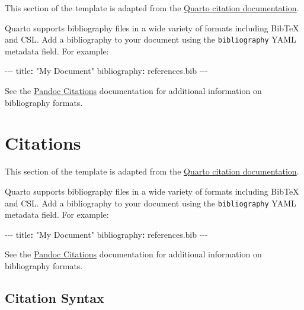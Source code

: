 \documentclass[
]{interact}
\newenvironment{Shaded}{\begin{snugshade}}{\end{snugshade}}
\newcommand{\AttributeTok}[1]{\textcolor[rgb]{0.40,0.45,0.13}{#1}}
\newcommand{\FunctionTok}[1]{\textcolor[rgb]{0.28,0.35,0.67}{#1}}
\newcommand{\KeywordTok}[1]{\textcolor[rgb]{0.00,0.23,0.31}{\textbf{#1}}}
\newcommand{\PreprocessorTok}[1]{\textcolor[rgb]{0.68,0.00,0.00}{#1}}
\newcommand{\StringTok}[1]{\textcolor[rgb]{0.13,0.47,0.30}{#1}}
\begin{document}
This section of the template is adapted from the
\href{https://quarto.org/docs/authoring/footnotes-and-citations.html}{Quarto
citation documentation}.

Quarto supports bibliography files in a wide variety of formats
including BibTeX and CSL. Add a bibliography to your document using the
\texttt{bibliography} YAML metadata field. For example:

\begin{Shaded}
\begin{Highlighting}[]
\PreprocessorTok{{-}{-}{-}}
\FunctionTok{title}\KeywordTok{:}\AttributeTok{ }\StringTok{"My Document"}
\FunctionTok{bibliography}\KeywordTok{:}\AttributeTok{ references.bib}
\PreprocessorTok{{-}{-}{-}}
\end{Highlighting}
\end{Shaded}

See the \href{https://pandoc.org/MANUAL.html\#citations}{Pandoc
Citations} documentation for additional information on bibliography
formats.

\section{Citations}\label{citations-1}

This section of the template is adapted from the
\href{https://quarto.org/docs/authoring/footnotes-and-citations.html}{Quarto
citation documentation}.

Quarto supports bibliography files in a wide variety of formats
including BibTeX and CSL. Add a bibliography to your document using the
\texttt{bibliography} YAML metadata field. For example:

\begin{Shaded}
\begin{Highlighting}[]
\PreprocessorTok{{-}{-}{-}}
\FunctionTok{title}\KeywordTok{:}\AttributeTok{ }\StringTok{"My Document"}
\FunctionTok{bibliography}\KeywordTok{:}\AttributeTok{ references.bib}
\PreprocessorTok{{-}{-}{-}}
\end{Highlighting}
\end{Shaded}

See the \href{https://pandoc.org/MANUAL.html\#citations}{Pandoc
Citations} documentation for additional information on bibliography
formats.

\subsection{Citation Syntax}\label{sec-citations}
\end{document}
